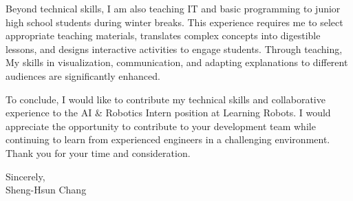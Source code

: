 \documentclass[12pt,a4paper]{article}
\newcommand{\Name}{Sheng-Hsun Chang}
\begin{document}
Beyond technical skills, I am also teaching IT and basic programming to junior high school students during winter breaks.
This experience requires me to select appropriate teaching materials, translates complex concepts into digestible lessons,
and designs interactive activities to engage students. Through teaching, My skills in visualization, communication, 
and adapting explanations to different audiences are significantly enhanced.

To conclude, I would like to contribute my technical skills and collaborative experience to the AI \& Robotics Intern position at Learning Robots. 
I would appreciate the opportunity to contribute to your development team while continuing to learn from experienced engineers in a challenging environment. 
Thank you for your time and consideration.


Sincerely,\\
\vspace{10pt}
\Name
\end{document}
